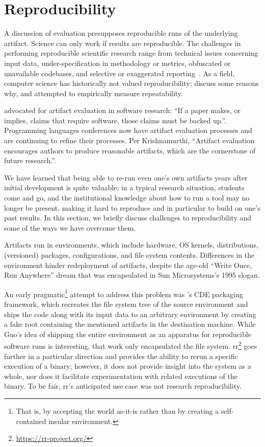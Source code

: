 \section{Reproducibility}
\label{sec:reproducibility}

A discussion of evaluation presupposes reproducible runs of the
underlying artifact. Science can only work if results are
reproducible.  The challenges in performing reproducible scientific
research range from technical issues concerning input data,
under-specification in methodology or metrics, obfuscated or
unavailable codebases, and selective or exaggerated
reporting~\cite{allison2018reproducibility}. As a field, computer
science has historically not valued reproducibility; 
discuss some reasons why, and 
attempted to empirically measure repeatability.

 advocated for artifact evaluation in software research: ``If a paper makes, or implies, claims that require software, those claims must be backed up.''. Programming languages conferences now have artifact evaluation processes and are continuing to refine their processes. Per Krishnamurthi, ``Artifact evaluation encourages authors to produce reasonable artifacts, which are the cornerstone of future research.''.

We have learned that being able to re-run even one's own artifacts years after 
initial development is quite valuable; in a typical research situation,
students come and go, and the institutional knowledge about how to run a
tool may no longer be present, making it hard to reproduce and in particular to build
on one's past results. In this section, we briefly discuss challenges
to reproducibility and some of the ways we have overcome them.

Artifacts run in environments, which include hardware, OS kernels,
distributions, (versioned) packages, configurations, and file system
contents. Differences in the environment hinder redeployment of artifacts,
despite the age-old ``Write Once, Run Anywhere'' dream that was encapsulated in
Sun Microsystems's 1995 slogan.

An early pragmatic\footnote{That is, by accepting the world as-it-is rather than by creating a self-contained insular environment.} attempt to address this problem was 's CDE 
packaging framework, which recreates the file system tree of the source environment and ships the code along with its input data to an arbitrary environment by creating a fake root containing the mentioned artifacts in the destination machine. While Guo's idea of shipping the entire environment as an apparatus for reproducible software runs is interesting, that work only encapsulated the file system. rr\footnote{\url{https://rr-project.org/}} goes further in a particular direction and provides the ability to rerun a specific execution of a binary; however, it does not provide insight into the system as a whole, nor does it facilitate experimentation with related executions of the binary. To be fair, rr's anticipated use case was not research reproducibility.

